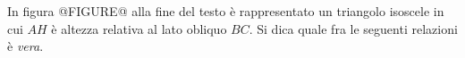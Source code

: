 In 
figura @FIGURE@ alla fine del testo
 è rappresentato un triangolo isoscele in cui $AH$ è altezza 
relativa al lato obliquo $BC$. Si dica quale fra le seguenti relazioni
è \emph{vera}.